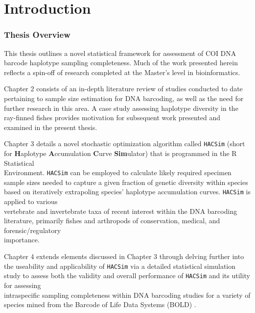 \linespread{1.0}

\chapter{Introduction}
\subsection{Thesis Overview} \label{sec:intro1}

This thesis outlines a novel statistical framework for assessment of COI DNA barcode haplotype sampling completeness. Much of the work presented herein reflects a spin-off of research completed at the Master's level in bioinformatics.

Chapter 2 consists of an in-depth literature review of studies conducted to date \\ pertaining to sample size estimation for DNA barcoding, as well as the need for further research in this area. A case study assessing haplotype diversity in the ray-finned fishes \cite{phillips2015exploration} provides motivation for subsequent work presented and examined in the present thesis. 

Chapter 3 details a novel stochastic optimization algorithm called {\tt HACSim} (short for \textbf{H}aplotype \textbf{A}ccumulation \textbf{C}urve \textbf{Sim}ulator) that is programmed in the R Statistical \\ Environment. {\tt HACSim} can be employed to calculate likely required specimen sample sizes needed to capture a given fraction of genetic diversity within species based on iteratively extrapoling species' haplotype accumulation curves. {\tt HACSim} is applied to various \\ vertebrate and invertebrate taxa of recent interest within the DNA barcoding literature, primarily fishes and arthropods of conservation, medical, and forensic/regulatory \\ importance.

Chapter 4 extends elements discussed in Chapter 3 through delving further into the useability and applicability of {\tt HACSim} via a detailed statistical simulation study to assess both the validity and overall performance of {\tt HACSim} and its utility for assessing \\ intraspecific sampling completeness within DNA barcoding studies for a variety of species mined from the Barcode of Life Data Systems (BOLD) \cite{ratnasingham2007bold}.

